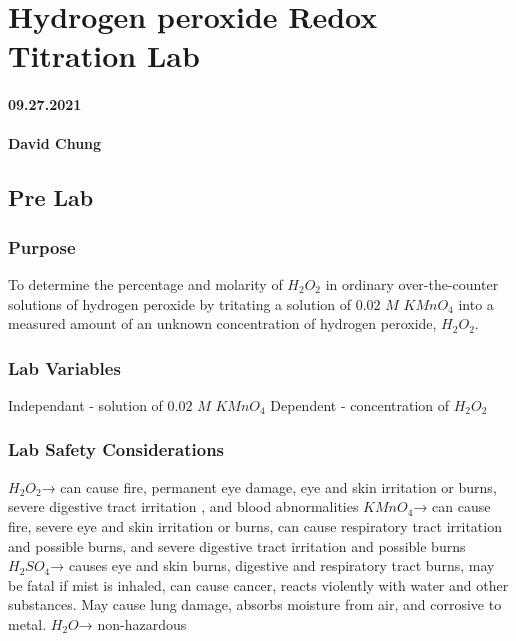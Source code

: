 \documentclass[
]{article}
\author{}
\date{}
\begin{document}
\hypertarget{hydrogen-peroxide-redox-titration-lab}{%
\section{Hydrogen peroxide Redox Titration
Lab}\label{hydrogen-peroxide-redox-titration-lab}}

\hypertarget{section}{%
\paragraph{09.27.2021}\label{section}}

\hypertarget{david-chung}{%
\paragraph{David Chung}\label{david-chung}}

\hypertarget{pre-lab}{%
\subsection{Pre Lab}\label{pre-lab}}

\hypertarget{purpose}{%
\subsubsection{Purpose}\label{purpose}}

To determine the percentage and molarity of \(H_2O_2\) in ordinary
over-the-counter solutions of hydrogen peroxide by tritating a solution
of \(0.02\) \(M\) \(KMnO_4\) into a measured amount of an unknown
concentration of hydrogen peroxide, \(H_2O_2.\)

\hypertarget{lab-variables}{%
\subsubsection{Lab Variables}\label{lab-variables}}

Independant - solution of \(0.02\) \(M\) \(KMnO_4\) Dependent -
concentration of \(H_2O_2\)

\hypertarget{lab-safety-considerations}{%
\subsubsection{Lab Safety
Considerations}\label{lab-safety-considerations}}

\(H_2O_2\)→ can cause fire, permanent eye damage, eye and skin
irritation or burns, severe digestive tract irritation , and blood
abnormalities \(KMnO_4\)→ can cause fire, severe eye and skin irritation
or burns, can cause respiratory tract irritation and possible burns, and
severe digestive tract irritation and possible burns \(H_2SO_4\)→ causes
eye and skin burns, digestive and respiratory tract burns, may be fatal
if mist is inhaled, can cause cancer, reacts violently with water and
other substances. May cause lung damage, absorbs moisture from air, and
corrosive to metal. \(H_2O\)→ non-hazardous
\end{document}
